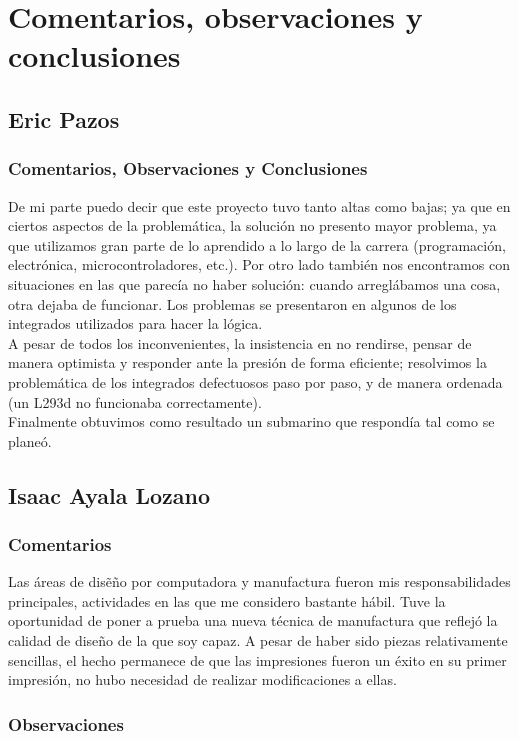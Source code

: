 \pagebreak[2]

\section{Comentarios, observaciones y conclusiones}
\subsection{Eric Pazos}
\subsubsection{Comentarios, Observaciones y Conclusiones}
De mi parte puedo decir que este proyecto tuvo tanto altas como bajas; ya que en ciertos aspectos de la problem\'atica,
la solución no presento mayor problema, ya que utilizamos gran parte de lo aprendido a lo largo de la carrera
(programaci\'on, electr\'onica, microcontroladores, etc.). Por otro lado tambi\'en nos encontramos con situaciones en
las que parec\'ia no haber soluci\'on: cuando arregl\'abamos una cosa, otra dejaba de funcionar. Los problemas se
presentaron en algunos de los integrados utilizados para hacer la l\'ogica.\\
A pesar de todos los inconvenientes, la insistencia en no rendirse, pensar de manera optimista y responder ante la
presi\'on de forma eficiente; resolvimos la problem\'atica de los integrados defectuosos paso por paso, y de manera
ordenada (un L293d no funcionaba correctamente).\\
Finalmente obtuvimos como resultado un submarino que respond\'ia tal como se plane\'o.

\subsection{Isaac Ayala Lozano}
\subsubsection{Comentarios}
Las \'areas de dis\~e\~no por computadora y manufactura fueron mis responsabilidades principales, actividades en las que
me considero bastante h\'abil. Tuve la oportunidad de poner a prueba una nueva t\'ecnica de manufactura que reflej\'o
la calidad de dise\~no de la que soy capaz. A pesar de haber sido piezas relativamente sencillas, el hecho permanece de que
las impresiones fueron un \'exito en su primer impresi\'on, no hubo necesidad de realizar modificaciones a ellas.

\subsubsection{Observaciones}

